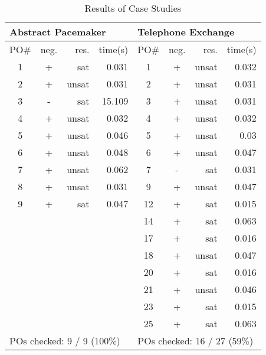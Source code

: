 \begin{table}[htb]
\begin{center}
\begin{tabular}{|c|c|r|r||c|c|r|r|}
\hline
\multicolumn{4}{|l||}{Abstract Pacemaker} & \multicolumn{4}{|l|}{Telephone Exchange} \\
\hline \hline
PO\#	&	neg.	&	res.	&	time(s)	&	PO\#	&	neg.	&	res.	&	time(s) \\ \hline
1		&	+		&	sat		&	0.031	&	1		&	+		&	unsat	&	0.032 \\ \hline
2		&	+		&	unsat	&	0.031	&	2		&	+		&	unsat	&	0.031 \\ \hline
3		&	-		&	sat		&	15.109	&	3		&	+		&	unsat	&	0.031 \\ \hline
4		&	+		&	unsat	&	0.032	&	4		&	+		&	unsat	&	0.032 \\ \hline
5		&	+		&	unsat	&	0.046	&	5		&	+		&	unsat	&	0.03 \\ \hline
6		&	+		&	unsat	&	0.048	&	6		&	+		&	unsat	&	0.047 \\ \hline
7		&	+		&	unsat	&	0.062	&	7		&	-		&	sat		&	0.031 \\ \hline
8		&	+		&	unsat	&	0.031	&	9		&	+		&	unsat	&	0.047 \\ \hline
9		&	+		&	sat		&	0.047	&	12		&	+		&	sat		&	0.015 \\ \hline
		&			&			&			&	14		&	+		&	sat		&	0.063 \\ \hline
		&			&			&			&	17		&	+				&	sat		&	0.016 \\ \hline
		&			&			&			&	18		&	+		&	unsat	&	0.047 \\ \hline
		&			&			&			&	20		&	+		&	sat		&	0.016 \\ \hline
		&			&			&			&	21		&	+		&	unsat	&	0.046 \\ \hline
		&			&			&			&	23		&	+		&	sat		&	0.015 \\ \hline
		&			&			&			&	25		&	+		&	sat		&	0.063 \\ \hline \hline
\multicolumn{4}{|l||}{POs checked: 9 / 9 (100\%)} & \multicolumn{4}{|l|}{POs checked: 16 / 27 (59\%)} \\ \hline		
\end{tabular}
\end{center}
\caption{Results of Case Studies}
\label{tbl:results}
\vspace{-20pt}
\end{table}

